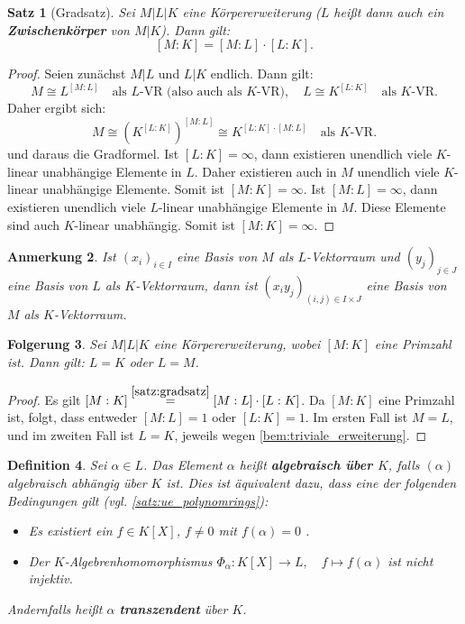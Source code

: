 \documentclass[a4paper, twoside, 11pt, ngerman]{report}
\theoremstyle{definistyle}
\newtheorem{satz}{Satz}[section]
\newtheorem{defini}[satz]{Definition}
\newtheorem{anm}[satz]{Anmerkung}
\newtheorem{folgerung}[satz]{Folgerung}
\theoremstyle{remark}
\newcommand{\defn}[1]{\textit{\bfseries #1}}
\begin{document}
\begin{satz}[Gradsatz]\label{satz:gradsatz}
Sei $M|L|K$ eine Körpererweiterung ($L$ heißt dann auch ein \defn{Zwischenkörper} von $M|K$). Dann gilt:
\[
[M : K] = [M : L] \cdot [L : K].
\]
\end{satz}
\begin{proof}
Seien zunächst $M|L$ und $L|K$ endlich. Dann gilt:
    \[
    M \cong L^{[M:L]} \quad \text{als } L\text{-VR (also auch als $K$-VR)}, \quad L \cong K^{[L:K]} \quad \text{als } K\text{-VR}.
    \]
    Daher ergibt sich:
    \[
    M \cong \left(K^{[L:K]}\right)^{[M:L]} \cong K^{[L:K] \cdot [M:L]} \quad \text{als } K\text{-VR}.
    \]
    und daraus die Gradformel. Ist $[L : K] = \infty$, dann existieren unendlich viele $K$-linear unabhängige Elemente in $L$. Daher existieren auch in $M$ unendlich viele $K$-linear unabhängige Elemente. Somit ist $[M : K] = \infty$.
    Ist $[M : L] = \infty$, dann existieren unendlich viele $L$-linear unabhängige Elemente in $M$. Diese Elemente sind auch $K$-linear unabhängig. Somit ist $[M : K] = \infty$.
\end{proof}

\begin{anm}
Ist $(x_i)_{i\in I}$ eine Basis von $M$ als $L$-Vektorraum und $(y_j)_{j\in J}$ eine Basis von $L$ als $K$-Vektorraum,
dann ist $(x_iy_j)_{(i,j)\in I\times J}$ eine Basis von $M$ als $K$-Vektorraum.
\end{anm}

\begin{folgerung}\label{folgerung:primzahl_zwischenkörper}
Sei $M|L|K$ eine Körpererweiterung, wobei $[M : K]$ eine Primzahl ist. Dann gilt: $L = K$ oder $L = M$.
\end{folgerung}

\begin{proof}
Es gilt $[M : K] \overset{\ref{satz:gradsatz}}{=} [M : L] \cdot [L : K]$. Da $[M : K]$ eine Primzahl ist, folgt, dass entweder $[M : L] = 1$ oder $[L : K] = 1$. Im ersten Fall ist $M = L$, und im zweiten Fall ist $L = K$, jeweils wegen \ref{bem:triviale_erweiterung}.
\end{proof}

\begin{defini}\label{def:algebraisch_unabhängig}
Sei $\alpha\in L$. Das Element $\alpha$ heißt \defn{algebraisch über $K$}, falls $(\alpha)$ algebraisch abhängig über $K$ ist. Dies ist äquivalent dazu, dass eine der folgenden Bedingungen gilt (vgl. \ref {satz:ue_polynomrings}):
\begin{itemize}
    \item Es existiert ein $f \in K[X]$, $f \neq 0$ mit $f(\alpha) = 0$ .
    \item Der $K$-Algebrenhomomorphismus $\Phi_\alpha : K[X] \to L, \quad f \mapsto f(\alpha)$ ist nicht injektiv.
\end{itemize}
Andernfalls heißt $\alpha$ \defn{transzendent} über $K$.
\end{defini}
\end{document}
